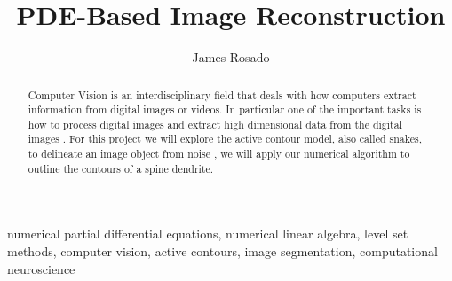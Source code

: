 \documentclass[margin=1in,12pt,3p]{elsarticle}
\begin{document}
\onehalfspacing
\begin{frontmatter}
\title{PDE-Based Image Reconstruction}

\author{James Rosado} %


\begin{abstract}
 Computer Vision is an interdisciplinary field that deals with how computers extract information from digital images or videos. In particular one of the important tasks is how to process digital images and extract high dimensional data from the digital images \cite{klette2014concise,shapiro2001computer,morris2003computer}. For this project we will explore the active contour model, also called snakes, to delineate an image object from noise \cite{Kass88snakes:active}, we will apply our numerical algorithm to outline the contours of a spine dendrite.
\end{abstract}

\begin{keyword}
  numerical partial differential equations, numerical linear algebra, level set methods, computer vision, active contours, image segmentation, computational neuroscience
\end{keyword}

\end{frontmatter}
\end{document}
